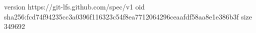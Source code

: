 version https://git-lfs.github.com/spec/v1
oid sha256:fcd74f94235cc3a0396f116323c54f8ea7712064296ceaafdf58aa8e1e386b3f
size 349692

